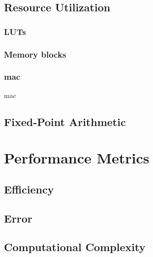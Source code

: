 \subsection{Resource Utilization}
\subsubsection{LUTs}
\subsubsection{Memory blocks}
\subsubsection{\acrshort{mac}}
\acrfull{mac}


\subsection{Fixed-Point Arithmetic}
\section{Performance Metrics}
\subsection{Efficiency}
\subsection{Error}
\subsection{Computational Complexity}
